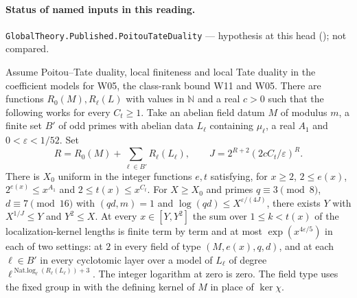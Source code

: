

\paragraph{Status of named inputs in this reading.}
\noindent\nolinkurl{GlobalTheory.Published.PoitouTateDuality} --- hypothesis at this head (); not compared.\par

\begin{formalstatement}\label{sub:W12}
Assume Poitou--Tate duality, local finiteness and local Tate duality
in the coefficient models for W05, the class-rank bound W11 and W05.
There are functions $R_0(M),R_\ell(L)$ with values in $\mathbb N$
and a real $c>0$ such that the following works for every $C_t\ge1$.
Take an abelian field datum $M$ of modulus $m$, a finite set $B'$ of
odd primes with abelian data $L_\ell$ containing $\mu_\ell$, a real
$A_1$ and $0<\varepsilon<1/52$. Set
\[
 R=R_0(M)+\sum_{\ell\in B'}R_\ell(L_\ell),\qquad
 J=2^{R+2}(2cC_t/\varepsilon)^R .
\]
There is $X_0$ uniform in the integer functions $e,t$ satisfying,
for $x\ge2$, $2\le e(x)$, $2^{e(x)}\le x^{A_1}$ and
$2\le t(x)\le x^{C_t}$. For $X\ge X_0$ and primes $q\equiv3\pmod8$,
$d\equiv7\pmod{16}$ with $(qd,m)=1$ and
$\log(qd)\le X^{\varepsilon/(4J)}$, there exists $Y$ with
$X^{1/J}\le Y$ and $Y^2\le X$. At every $x\in[Y,Y^2]$ the sum over
$1\le k<t(x)$ of the localization-kernel lengths is finite term by term
and at most $\exp(x^{4\varepsilon/5})$ in each of two settings:
at $2$ in every field of type $(M,e(x),q,d)$, and at each
$\ell\in B'$ in every cyclotomic layer over a model of $L_\ell$
of degree $\ell^{\operatorname{Nat.log}_\ell(R_\ell(L_\ell))+3}$.
The integer logarithm at zero is zero. The field type uses the fixed
group in  with the defining kernel of $M$ in place
of $\ker\chi$.
\end{formalstatement}
